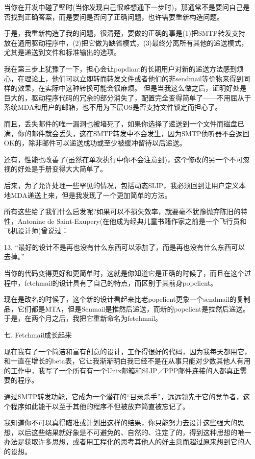 \documentclass[a4paper,12pt,UTF8,twoside]{ctexbook}
\begin{document}
当你在开发中碰了壁时(当你发现自己很难想通下一步时)，那通常不是要问自己是否找到正确答案，而是要问是否问了正确问题，也许需要重新构造问题。


于是，我重新构造了我的问题，很清楚，要做的正确的事是(1)把SMTP转发支持放在通用驱动程序中，(2)把它做为缺省模式，(3)最终分离所有其他的递送模式，尤其是递送到文件和标准输出的选项。


我在第三步上犹豫了一下，担心会让popdiant的长期用户对新的递送方法感到烦心，在理论上，他们可以立即转而转发文件或者他们的非sendmail等价物来得到同样的效果，在实际中这种转换可能会很麻烦。
但是当我这么做之后，证明好处是巨大的，驱动程序代码的冗余的部分消失了，配置完全变得简单了——不用屈从于系统MDA和用户的邮箱，也不用为下层OS是否支持文件锁定而担心了。


而且，丢失邮件的唯一漏洞也被堵死了，如果你选择了递送到一个文件而磁盘已满，你的邮件就会丢失，这在SMTP转发中不会发生，因为SMTP侦听器不会返回OK的，除非邮件可以递送成功或至少被缓冲留待以后递送。


还有，性能也改善了(虽然在单次执行中你不会注意到)，这个修改的另一个不可忽视的好处是手册变得大大简单了。


后来，为了允许处理一些罕见的情况，包括动态SLIP，我必须回到让用户定义本地MDA递送上来，但是我发现了一个更加简单的方法。


所有这些给了我们什么启发呢?如果可以不损失效率，就要毫不犹豫抛弃陈旧的特性，Antonine de Saint-Exupery(在他成为经典儿童书籍作家之前是一个飞行员和飞机设计师)曾说过：


13. “最好的设计不是再也没有什么东西可以添加了，而是再也没有什么东西可以去掉。”


当你的代码变得更好和更简单时，这就是你知道它是正确的时候了，而且在这个过程中，fetehmail的设计具有了自己的特点，而区别于其前身popclient。


现在是改名的时候了，这个新的设计看起来比老popclient更象一个sendmail的复制品，它们都是MTA，但是Senmail是推然后递送，而新的popclient是拉然后递送。于是，在两个月之后，我把它重新命名为fetehmail。


七. Fetchmail成长起来


现在我有了一个简洁和富有创意的设计，工作得很好的代码，因为我每天都用它，和一直在增长的beta表，它让我渐渐明白我已经不是在从事只能对少数其他人有用的工作中，我写了一个所有有一个Unix邮箱和SLIP／PPP邮件连接的人都真正需要的程序。


通过SMTP转发功能，它成为一个潜在的“目录杀手”，远远领先于它的竞争者，这个程序如此能干以至于其他的程序不但被放弃简直被忘记了。


我知道你不可以真得瞄准或计划出这样的结果，你只能努力去设计这些强大的思想，以后这些结果就好象是不可避免的、自然的、注定了的，得到这种思想的唯一办法是获取许多思想，或者用工程化的思考其他人的好主意而超过原来想到它的人的设想。
\end{document}
